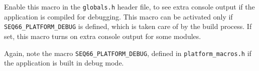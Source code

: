%
%
%
%
%

      Enable this macro in the
      \texttt{globals.h} header file, to see extra console
      output if the application is compiled for debugging.  This macro can be
      activated only if \texttt{SEQ66\_PLATFORM\_DEBUG} is defined, which is taken
      care of by the build process.  If set, this macro turns on extra
      console output for some modules.


      Again, note the macro \texttt{SEQ66\_PLATFORM\_DEBUG},
      defined in \texttt{platform\_macros.h} if the application is
      built in debug mode.

